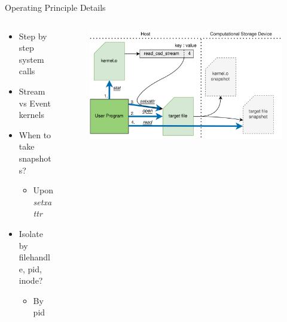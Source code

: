 \documentclass[aspectratio=169, notes]{beamer}
\begin{document}
\begin{frame}{Operating Principle Details}
    \begin{columns}
        \begin{column}{0.40\textwidth}
            \footnotesize
            \begin{itemize}
                \item Step by step system calls
                \item Stream vs Event kernels
                \item When to take snapshots?
                \begin{itemize}
                    \item Upon \textit{setxattr}
                \end{itemize}
                \item Isolate by filehandle, pid, inode?
                \begin{itemize}
                    \item By pid
                \end{itemize}
            \end{itemize}
            \textit{}
        \end{column}
        \begin{column}{0.60\textwidth}
            \begingroup
            \small
            \begin{figure}
                \centering
                \includegraphics[width=1\textwidth]{resources/images/offloading.png}
            \end{figure}
            \endgroup
        \end{column}
    \end{columns}
\end{frame}
\end{document}
